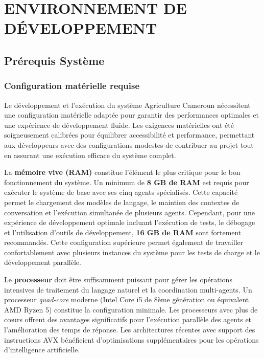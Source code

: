 \chapter*{ENVIRONNEMENT DE DÉVELOPPEMENT}


\section{Prérequis Système}

\subsection{Configuration matérielle requise}

Le développement et l'exécution du système Agriculture Cameroun nécessitent une configuration matérielle adaptée pour garantir des performances optimales et une expérience de développement fluide. Les exigences matérielles ont été soigneusement calibrées pour équilibrer accessibilité et performance, permettant aux développeurs avec des configurations modestes de contribuer au projet tout en assurant une exécution efficace du système complet.

La \textbf{mémoire vive (RAM)} constitue l'élément le plus critique pour le bon fonctionnement du système. Un minimum de \textbf{8 GB de RAM} est requis pour exécuter le système de base avec ses cinq agents spécialisés. Cette capacité permet le chargement des modèles de langage, le maintien des contextes de conversation et l'exécution simultanée de plusieurs agents. Cependant, pour une expérience de développement optimale incluant l'exécution de tests, le débogage et l'utilisation d'outils de développement, \textbf{16 GB de RAM} sont fortement recommandés. Cette configuration supérieure permet également de travailler confortablement avec plusieurs instances du système pour les tests de charge et le développement parallèle.

Le \textbf{processeur} doit être suffisamment puissant pour gérer les opérations intensives de traitement du langage naturel et la coordination multi-agents. Un processeur \emph{quad-core} moderne (Intel Core i5 de 8ème génération ou équivalent AMD Ryzen 5) constitue la configuration minimale. Les processeurs avec plus de cœurs offrent des avantages significatifs pour l'exécution parallèle des agents et l'amélioration des temps de réponse. Les architectures récentes avec support des instructions AVX bénéficient d'optimisations supplémentaires pour les opérations d'intelligence artificielle.

